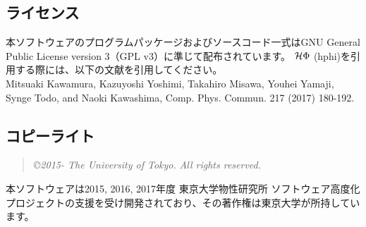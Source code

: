 \subsection{ライセンス}
本ソフトウェアのプログラムパッケージおよびソースコード一式はGNU General Public License version 3（GPL v3）に準じて配布されています。
$\mathcal{H} \Phi$ (hphi)を引用する際には、以下の文献を引用してください。\\
Mitsuaki Kawamura, Kazuyoshi Yoshimi, Takahiro Misawa, Youhei Yamaji, Synge Todo, and Naoki Kawashima, 
Comp. Phys. Commun. 217 (2017) 180-192.

\subsection{コピーライト}
\begin{quote}
{\it \copyright  2015- The University of Tokyo.} {\it All rights reserved.}
\end{quote}
本ソフトウェアは2015, 2016, 2017年度 東京大学物性研究所 ソフトウェア高度化プロジェクトの支援を受け開発されており、その著作権は東京大学が所持しています。

